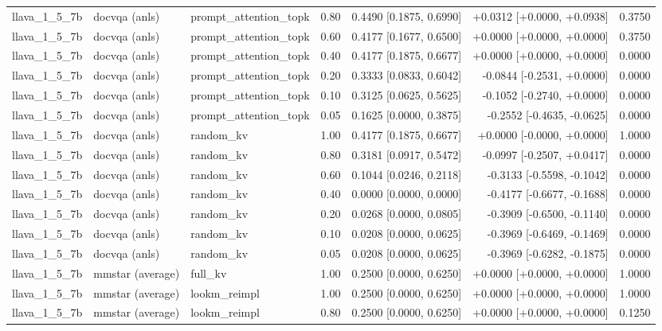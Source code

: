 \begin{longtable}{lllrrrr}
llava\_1\_5\_7b & docvqa (anls) & prompt\_attention\_topk & 0.80 & 0.4490 [0.1875, 0.6990] & +0.0312 [+0.0000, +0.0938] & 0.3750 \\
llava\_1\_5\_7b & docvqa (anls) & prompt\_attention\_topk & 0.60 & 0.4177 [0.1677, 0.6500] & +0.0000 [+0.0000, +0.0000] & 0.3750 \\
llava\_1\_5\_7b & docvqa (anls) & prompt\_attention\_topk & 0.40 & 0.4177 [0.1875, 0.6677] & +0.0000 [+0.0000, +0.0000] & 0.0000 \\
llava\_1\_5\_7b & docvqa (anls) & prompt\_attention\_topk & 0.20 & 0.3333 [0.0833, 0.6042] & -0.0844 [-0.2531, +0.0000] & 0.0000 \\
llava\_1\_5\_7b & docvqa (anls) & prompt\_attention\_topk & 0.10 & 0.3125 [0.0625, 0.5625] & -0.1052 [-0.2740, +0.0000] & 0.0000 \\
llava\_1\_5\_7b & docvqa (anls) & prompt\_attention\_topk & 0.05 & 0.1625 [0.0000, 0.3875] & -0.2552 [-0.4635, -0.0625] & 0.0000 \\
llava\_1\_5\_7b & docvqa (anls) & random\_kv & 1.00 & 0.4177 [0.1875, 0.6677] & +0.0000 [-0.0000, +0.0000] & 1.0000 \\
llava\_1\_5\_7b & docvqa (anls) & random\_kv & 0.80 & 0.3181 [0.0917, 0.5472] & -0.0997 [-0.2507, +0.0417] & 0.0000 \\
llava\_1\_5\_7b & docvqa (anls) & random\_kv & 0.60 & 0.1044 [0.0246, 0.2118] & -0.3133 [-0.5598, -0.1042] & 0.0000 \\
llava\_1\_5\_7b & docvqa (anls) & random\_kv & 0.40 & 0.0000 [0.0000, 0.0000] & -0.4177 [-0.6677, -0.1688] & 0.0000 \\
llava\_1\_5\_7b & docvqa (anls) & random\_kv & 0.20 & 0.0268 [0.0000, 0.0805] & -0.3909 [-0.6500, -0.1140] & 0.0000 \\
llava\_1\_5\_7b & docvqa (anls) & random\_kv & 0.10 & 0.0208 [0.0000, 0.0625] & -0.3969 [-0.6469, -0.1469] & 0.0000 \\
llava\_1\_5\_7b & docvqa (anls) & random\_kv & 0.05 & 0.0208 [0.0000, 0.0625] & -0.3969 [-0.6282, -0.1875] & 0.0000 \\
llava\_1\_5\_7b & mmstar (average) & full\_kv & 1.00 & 0.2500 [0.0000, 0.6250] & +0.0000 [+0.0000, +0.0000] & 1.0000 \\
llava\_1\_5\_7b & mmstar (average) & lookm\_reimpl & 1.00 & 0.2500 [0.0000, 0.6250] & +0.0000 [+0.0000, +0.0000] & 1.0000 \\
llava\_1\_5\_7b & mmstar (average) & lookm\_reimpl & 0.80 & 0.2500 [0.0000, 0.6250] & +0.0000 [+0.0000, +0.0000] & 0.1250 \\

\end{longtable}

